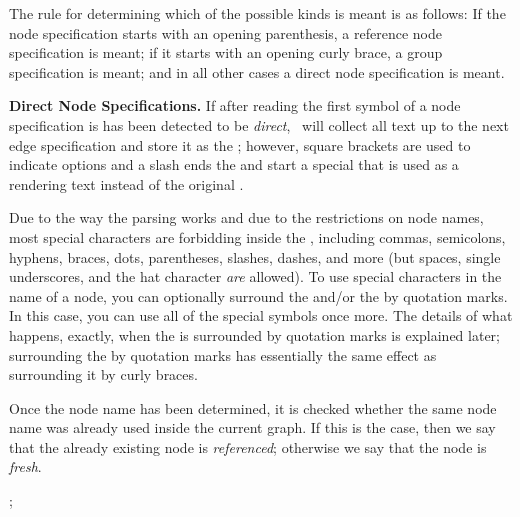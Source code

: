 The rule for determining which of the possible kinds is meant is
as follows: If the node specification starts with an opening
parenthesis, a reference node specification is meant; if it starts
with an opening curly brace, a group specification is meant; and in 
all other cases a direct node specification is meant.

\medskip
\textbf{Direct Node Specifications.} If after reading the first symbol
of a node specification is has been detected to be \emph{direct},
\tikzname\ will collect all text up to the next edge
specification and store it as the ; however, square
brackets are used to indicate options and a slash ends the  and start a special  that is used as a 
rendering text instead of the original .

Due to the way the parsing works and due to the restrictions on node
names, most special characters are forbidding inside the , including commas, semicolons, hyphens, braces, dots,
parentheses, slashes, dashes, and more (but spaces, single
underscores, and the hat character \emph{are} allowed). To use special
characters in the name of a node, you can optionally surround the
 and/or the  by quotation marks. In this
case, you can use all of the special symbols once more. The details
of what happens, exactly, when the  is surrounded by
quotation marks is explained later; surrounding the  by
quotation marks has essentially the same effect as surrounding it by
curly braces.

Once the node name has been determined, it is checked whether the same
node name was already used inside the current graph. If this is the
case, then we say that the already existing node is \emph{referenced};
otherwise we say that the node is \emph{fresh}.

\begin{codeexample}[]
\tikz {};
\end{codeexample}

